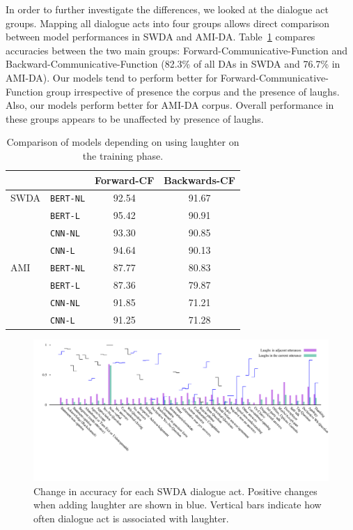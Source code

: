 \documentclass[11pt,a4paper]{article}
\begin{document}
In order to further investigate the differences, we looked at the dialogue act groups.
Mapping all dialogue acts into four groups allows direct comparison between model performances in SWDA and AMI-DA.
Table~\ref{table:laughter-group-acc} compares accuracies between the two main groups: Forward-Communicative-Function and Backward-Communicative-Function (82.3\% of all DAs in SWDA and 76.7\% in AMI-DA).
Our models tend to perform better for Forward-Communicative-Function group irrespective of presence the corpus and the presence of laughs.
Also, our models perform better for AMI-DA corpus.
Overall performance in these groups appears to be unaffected by presence of laughs.

\begin{table}
  \centering
  \begin{tabular}{@{}llcc@{}}
    \toprule
    &                  & Forward-CF  & Backwards-CF   \\ \midrule
    SWDA &\texttt{BERT-NL}  & 92.54 & 91.67       \\ 
         &\texttt{BERT-L}   & 95.42 & 90.91       \\ 
         &\texttt{CNN-NL}   & 93.30 & 90.85        \\
         &\texttt{CNN-L}    & 94.64 & 90.13        \\ \midrule
    AMI  &\texttt{BERT-NL}  & 87.77 & 80.83       \\ 
         &\texttt{BERT-L}   & 87.36 & 79.87       \\
         &\texttt{CNN-NL}   & 91.85 & 71.21        \\
         &\texttt{CNN-L}    & 91.25 & 71.28        \\    \bottomrule
  \end{tabular}
  \caption{Comparison of models depending on using laughter on the training phase. }
  \label{table:laughter-group-acc}
\end{table}

\begin{figure}
  \centering
  \includegraphics[width=\textwidth]{img/SWDA-bertLvsNL.pdf}
  \caption{Change in accuracy for each SWDA dialogue act. Positive changes when adding laughter are shown in blue. Vertical bars indicate how often dialogue act is associated with laughter.}
    \label{fig:swda-by-da}
\end{figure}
\end{document}

